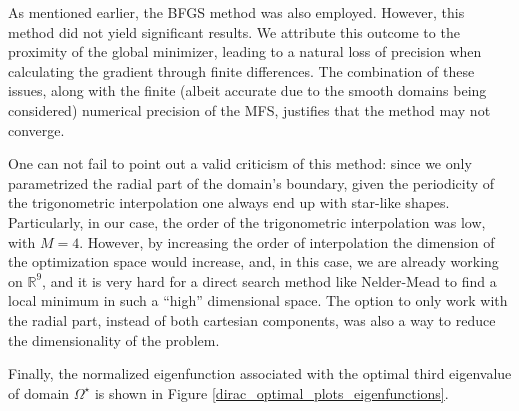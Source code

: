 \begin{figure}[!htb]
\begin{minipage}{.5\textwidth}
        \captionsetup{width=0.8\linewidth} %
        \label{dirac_val_third}
    \end{minipage}
\end{figure}

As mentioned earlier, the \ac{BFGS} method was also employed. However, this method did not yield significant results. We attribute this outcome to the proximity of the global minimizer, leading to a natural loss of precision when calculating the gradient through finite differences. The combination of these issues, along with the finite (albeit accurate due to the smooth domains being considered) numerical precision of the \ac{MFS}, justifies that the method may not converge.

\begin{remark}
    One can not fail to point out a valid criticism of this method: since we only parametrized the radial part of the domain's boundary, given the periodicity of the trigonometric interpolation one always end up with star-like shapes. Particularly, in our case, the order of the trigonometric interpolation was low, with \(M=4\). However, by increasing the order of interpolation the dimension of the optimization space would increase, and, in this case, we are already working on \(\mathbb{R}^9\), and it is very hard for a direct search method like Nelder-Mead to find a local minimum in such a ``high'' dimensional space. The option to only work with the radial part, instead of both cartesian components, was also a way to reduce the dimensionality of the problem. 
\end{remark}

Finally, the normalized eigenfunction associated with the optimal third eigenvalue of domain \(\Omega^\star\) is shown in Figure \ref{dirac_optimal_plots_eigenfunctions}.

